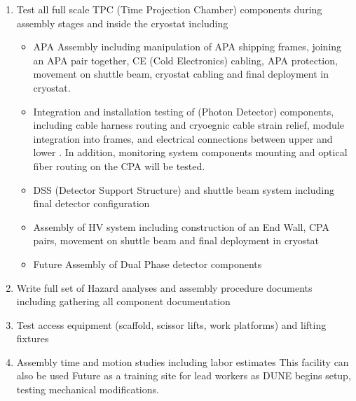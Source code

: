 \begin{enumerate}
\item Test all full scale TPC (Time Projection Chamber) components during assembly stages and inside the cryostat including  
\begin{itemize}
    \item APA  Assembly including manipulation of APA shipping frames, joining an APA pair together, CE (Cold Electronics) cabling, APA protection, movement on shuttle beam, cryostat cabling and final deployment in cryostat. 
    \item Integration and installation testing of  (Photon Detector) components, including cable harness routing and cryoegnic cable strain relief, module integration into  frames, and electrical connections between upper and lower .  In addition,  monitoring system components mounting and optical fiber routing on the CPA will be tested.
    \item DSS (Detector Support Structure) and shuttle beam system including final detector configuration 
    \item Assembly of HV system including construction of an End Wall, CPA pairs, movement on shuttle beam and final deployment in cryostat
    \item Future Assembly of Dual Phase detector components
\end{itemize}
\item Write full set of Hazard analyses and assembly procedure documents including gathering all component documentation 
\item Test access equipment (scaffold, scissor lifts, work platforms) and lifting fixtures 
\item Assembly time and motion studies including labor estimates
This facility can also be used Future as a training site for lead workers as DUNE begins setup, testing mechanical modifications.
\end{enumerate}

